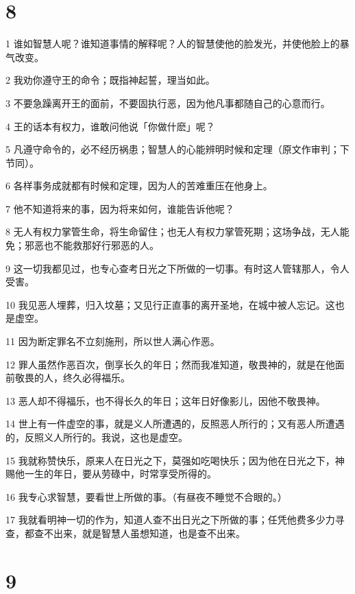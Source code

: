 \chapter{8}

\par 1 谁如智慧人呢？谁知道事情的解释呢？人的智慧使他的脸发光，并使他脸上的暴气改变。
\par 2 我劝你遵守王的命令；既指神起誓，理当如此。
\par 3 不要急躁离开王的面前，不要固执行恶，因为他凡事都随自己的心意而行。
\par 4 王的话本有权力，谁敢问他说「你做什麽」呢？
\par 5 凡遵守命令的，必不经历祸患；智慧人的心能辨明时候和定理（原文作审判；下节同）。
\par 6 各样事务成就都有时候和定理，因为人的苦难重压在他身上。
\par 7 他不知道将来的事，因为将来如何，谁能告诉他呢？
\par 8 无人有权力掌管生命，将生命留住；也无人有权力掌管死期；这场争战，无人能免；邪恶也不能救那好行邪恶的人。
\par 9 这一切我都见过，也专心查考日光之下所做的一切事。有时这人管辖那人，令人受害。
\par 10 我见恶人埋葬，归入坟墓；又见行正直事的离开圣地，在城中被人忘记。这也是虚空。
\par 11 因为断定罪名不立刻施刑，所以世人满心作恶。
\par 12 罪人虽然作恶百次，倒享长久的年日；然而我准知道，敬畏神的，就是在他面前敬畏的人，终久必得福乐。
\par 13 恶人却不得福乐，也不得长久的年日；这年日好像影儿，因他不敬畏神。
\par 14 世上有一件虚空的事，就是义人所遭遇的，反照恶人所行的；又有恶人所遭遇的，反照义人所行的。我说，这也是虚空。
\par 15 我就称赞快乐，原来人在日光之下，莫强如吃喝快乐；因为他在日光之下，神赐他一生的年日，要从劳碌中，时常享受所得的。
\par 16 我专心求智慧，要看世上所做的事。（有昼夜不睡觉不合眼的。）
\par 17 我就看明神一切的作为，知道人查不出日光之下所做的事；任凭他费多少力寻查，都查不出来，就是智慧人虽想知道，也是查不出来。

\chapter{9}

